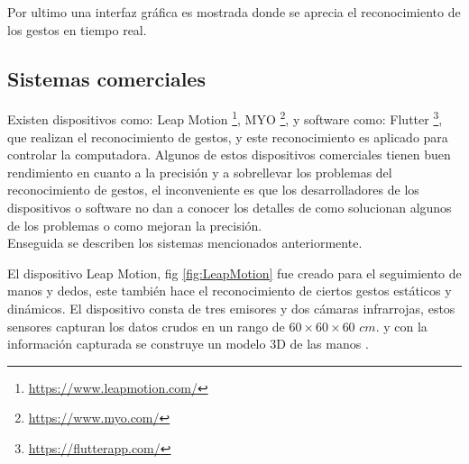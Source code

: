 Por ultimo una interfaz gráfica es mostrada donde se aprecia el reconocimiento de los gestos en tiempo real.  


 
\subsection{Sistemas comerciales}

Existen dispositivos como: Leap Motion \footnote{\label{LeapMotionFN} \url{https://www.leapmotion.com/}}, MYO \footnote{\label{MyoFN}  \url{https://www.myo.com/}}, y software como: Flutter \footnote{\label{FlutterFN} \url{ https://flutterapp.com/}}, que realizan el reconocimiento de gestos, y este reconocimiento es aplicado para controlar la computadora. Algunos de estos dispositivos comerciales tienen  buen rendimiento en cuanto a la precisión y a sobrellevar los problemas del reconocimiento de gestos, el inconveniente es que los desarrolladores de los dispositivos o software no dan a conocer los detalles de como solucionan algunos de los problemas o como mejoran la precisión. \\ 
Enseguida se describen los sistemas mencionados anteriormente.
 
El dispositivo Leap Motion, fig \ref{fig:LeapMotion} fue creado para el seguimiento de manos y dedos, este también hace el reconocimiento de ciertos gestos estáticos y dinámicos. El dispositivo consta de tres emisores y dos cámaras infrarrojas, estos sensores capturan los datos crudos en un rango de $60 \times 60 \times 60$ $cm.$ y con la información capturada se construye un modelo 3D de las manos \citep{Weichert2013}. 

